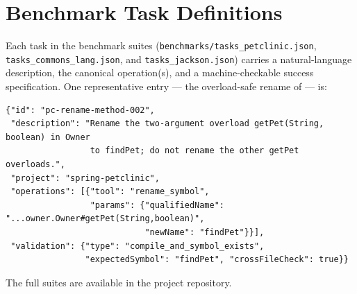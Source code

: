 \documentclass[11pt,a4paper]{report}
\begin{document}
\chapter{Benchmark Task Definitions}
Each task in the benchmark suites (\texttt{benchmarks/tasks\_petclinic.json},
\texttt{tasks\_commons\_lang.json}, and \texttt{tasks\_jackson.json}) carries a
natural-language description, the canonical operation(s), and a machine-checkable success
specification. One representative entry --- the overload-safe rename of
 --- is:
\begin{lstlisting}[basicstyle=\ttfamily\footnotesize]
{"id": "pc-rename-method-002",
 "description": "Rename the two-argument overload getPet(String, boolean) in Owner
                 to findPet; do not rename the other getPet overloads.",
 "project": "spring-petclinic",
 "operations": [{"tool": "rename_symbol",
                 "params": {"qualifiedName": "...owner.Owner#getPet(String,boolean)",
                            "newName": "findPet"}}],
 "validation": {"type": "compile_and_symbol_exists",
                "expectedSymbol": "findPet", "crossFileCheck": true}}
\end{lstlisting}
The full suites are available in the project repository.
\end{document}
